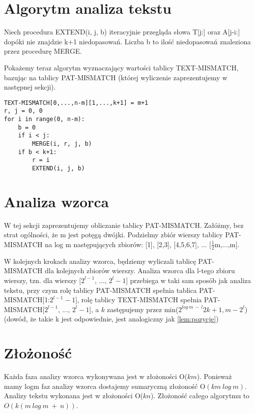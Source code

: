 \documentclass[
12pt
]{article}
\theoremstyle{definition}
\theoremstyle{remark}
\begin{document}
\section{Algorytm analiza tekstu}
Niech procedura EXTEND(i, j, b) iteracyjnie przegląda słowa T[j:] oraz A[j-i:] dopóki nie znajdzie k+1 niedopasowań. Liczba b to ilość niedopasowań znaleziona przez procedurę MERGE.

Pokażemy teraz algorytm wyznaczający wartości tablicy TEXT-MISMATCH, bazując na tablicy PAT-MISMATCH (której wyliczenie zaprezentujemy w następnej sekcji).
\begin{lstlisting}
TEXT-MISMATCH[0,...,n-m][1,...,k+1] = m+1
r, j = 0, 0
for i in range(0, n-m):
    b = 0
    if i < j:
        MERGE(i, r, j, b)
    if b < k+1:
        r = i
        EXTEND(i, j, b)

\end{lstlisting}
\section{Analiza wzorca}
W tej sekcji zaprezentujemy obliczanie tablicy PAT-MISMATCH. 
Załóżmy, bez strat ogólności, że m jest potęgą dwójki. 
Podzielmy zbiór wierszy tablicy PAT-MISMATCH na log m następujących zbiorów: [1], [2,3], [4,5,6,7], ... [$\frac{1}{2}$m,...,m].

W kolejnych krokach analizy wzorca, będziemy wyliczali tablicę PAT-MISMATCH dla kolejnych zbiorów wierszy.
Analiza wzorca dla l-tego zbioru wierszy, tzn. dla wierszy [$2^{l-1}$, ..., $2^l-1$] przebiega w taki sam sposób jak analiza tekstu, przy czym rolę tablicy PAT-MISMATCH spełnia tablica PAT-MISMATCH[1:$2^{l-1}-1$], rolę tablicy TEXT-MISMATCH spełnia PAT-MISMATCH[$2^{l-1}$, ..., $2^l-1$], a $k$ zastępujemy przez min($2^{log\ m\ -\ l}2k+1, m-2^l$) (dowód, że takie k jest odpowiednie, jest analogiczny jak \ref{lem:pozycje})

\section*{Złożoność}
Każda faza analizy wzorca wykonywana jest w złożoności O($km$). 
Ponieważ mamy logm faz analizy wzorca dostajemy sumaryczną złożoność O$(km \ log \ m)$.
Analizy tekstu wykonana jest w złożoności O($kn$).
Złożoność całego algorytmu to $O(k(m\ log\ m \ + \ n))$.
\end{document}
